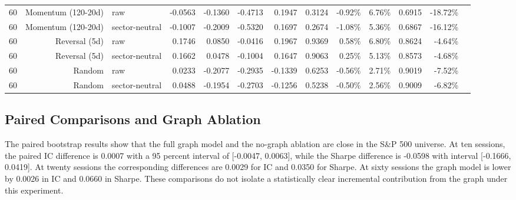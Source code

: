 \documentclass[10pt]{article}
\begin{document}
\begin{longtable}{rrlrrrrrrrrrr}
60 & Momentum (120-20d) & raw & -0.0563 & -0.1360 & -0.4713 & 0.1947 & 0.3124 & -0.92\% & 6.76\% & 0.6915 & -18.72\% \\
60 & Momentum (120-20d) & sector-neutral & -0.1007 & -0.2009 & -0.5320 & 0.1697 & 0.2674 & -1.08\% & 5.36\% & 0.6867 & -16.12\% \\
60 & Reversal (5d) & raw & 0.1746 & 0.0850 & -0.0416 & 0.1967 & 0.9369 & 0.58\% & 6.80\% & 0.8624 & -4.64\% \\
60 & Reversal (5d) & sector-neutral & 0.1662 & 0.0478 & -0.1004 & 0.1647 & 0.9063 & 0.25\% & 5.13\% & 0.8573 & -4.68\% \\
60 & Random & raw & 0.0233 & -0.2077 & -0.2935 & -0.1339 & 0.6253 & -0.56\% & 2.71\% & 0.9019 & -7.52\% \\
60 & Random & sector-neutral & 0.0488 & -0.1954 & -0.2703 & -0.1256 & 0.5238 & -0.50\% & 2.56\% & 0.9009 & -6.82\% \\
\bottomrule
\end{longtable}
\endgroup

\subsection{Paired Comparisons and Graph Ablation}

The paired bootstrap results show that the full graph model and the no-graph ablation are close in the S\&P 500 universe. At ten sessions, the paired IC difference is 0.0007 with a 95 percent interval of [-0.0047, 0.0063], while the Sharpe difference is -0.0598 with interval [-0.1666, 0.0419]. At twenty sessions the corresponding differences are 0.0029 for IC and 0.0350 for Sharpe. At sixty sessions the graph model is lower by 0.0026 in IC and 0.0660 in Sharpe. These comparisons do not isolate a statistically clear incremental contribution from the graph under this experiment.
\end{document}
